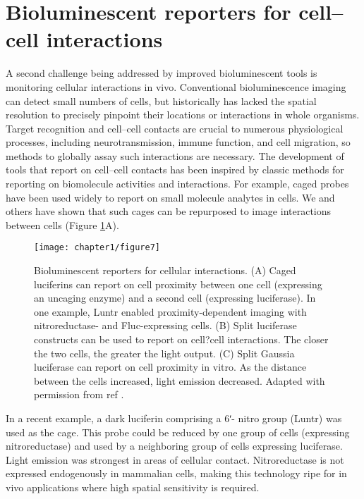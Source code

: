\section{Bioluminescent reporters for cell--cell interactions}
A second challenge being addressed by improved bioluminescent
tools is monitoring cellular interactions in vivo.
Conventional bioluminescence imaging can detect small
numbers of cells, but historically has lacked the spatial
resolution to precisely pinpoint their locations or interactions
in whole organisms. Target recognition and cell--cell contacts
are crucial to numerous physiological processes, including
neurotransmission, immune function, and cell migration, so
methods to globally assay such interactions are necessary.
The development of tools that report on cell--cell contacts
has been inspired by classic methods for reporting on
biomolecule activities and interactions. For example, caged
probes have been used widely to report on small molecule
analytes in cells. We and others\cite{Lindberg:2013bw} have shown that such cages
can be repurposed to image interactions between cells (Figure
\ref{fig:cell_contact}A).

\begin{figure}[htbp]
\texttt{[image: chapter1/figure7]}
\centering
\caption[Bioluminescent reporters for cellular interactions.]{Bioluminescent reporters for cellular interactions. (A) Caged
luciferins can report on cell proximity between one cell (expressing an
uncaging enzyme) and a second cell (expressing luciferase). In one
example, Luntr enabled proximity-dependent imaging with nitroreductase-
and Fluc-expressing cells. (B) Split luciferase constructs can
be used to report on cell?cell interactions. The closer the two cells,
the greater the light output. (C) Split Gaussia luciferase can report on
cell proximity in vitro. As the distance between the cells increased,
light emission decreased. Adapted with permission from ref \cite{Jones:2015gg}.}
  \label{fig:cell_contact}
\end{figure}

In a recent example, a dark luciferin comprising a 6ʹ-
nitro group (Luntr) was used as the cage.\cite{Porterfield:2015bj} This probe could
be reduced by one group of cells (expressing nitroreductase)
and used by a neighboring group of cells expressing luciferase.
Light emission was strongest in areas of cellular contact.
Nitroreductase is not expressed endogenously in mammalian
cells, making this technology ripe for in vivo applications where
high spatial sensitivity is required.

